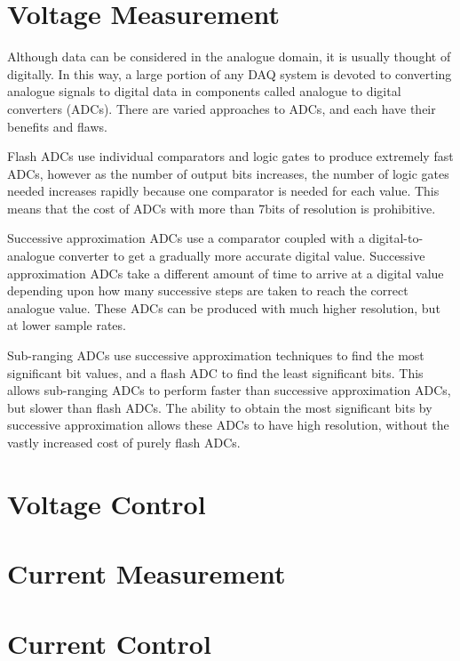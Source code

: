 \section{Voltage Measurement}
Although data can be considered in the analogue domain, it is usually thought of digitally. In this way, a large portion of any DAQ system is devoted to converting analogue signals to digital data in components called analogue to digital converters (ADCs). There are varied approaches to ADCs, and each have their benefits and flaws.

Flash ADCs use individual comparators and logic gates to produce extremely fast ADCs, however as the number of output bits increases, the number of logic gates needed increases rapidly because one comparator is needed for each value. This means that the cost of ADCs with more than 7bits of resolution is prohibitive.

Successive approximation ADCs use a comparator coupled with a digital-to-analogue converter to get a gradually more accurate digital value. Successive approximation ADCs take a different amount of time to arrive at a digital value depending upon how many successive steps are taken to reach the correct analogue value. These ADCs can be produced with much higher resolution, but at lower sample rates.

Sub-ranging ADCs use successive approximation techniques to find the most significant bit values, and a flash ADC to find the least significant bits. This allows sub-ranging ADCs to perform faster than successive approximation ADCs, but slower than flash ADCs. The ability to obtain the most significant bits by successive approximation allows these ADCs to have high resolution, without the vastly increased cost of purely flash ADCs.




\section{Voltage Control}


\section{Current Measurement}


\section{Current Control}